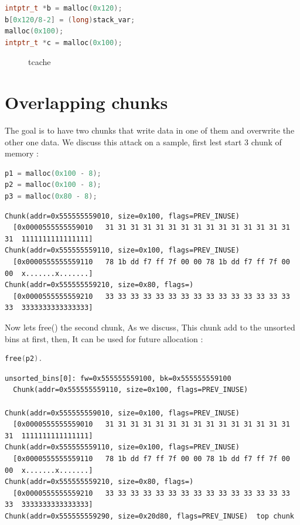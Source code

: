 \documentclass{masterthesis}
\newcommand*\tch{tcache}
\newcommand*\ub{unsorted bins}
\begin{document}
\begin{lstlisting}[language=c,frame=tlrb]
intptr_t *b = malloc(0x120);
b[0x120/8-2] = (long)stack_var;
malloc(0x100);
intptr_t *c = malloc(0x100);
\end{lstlisting}

 \begin{figure}[h!]
  \caption{\tch{}}
\end{figure}


\section{ Overlapping chunks}
The goal is to have two chunks that write data in one of them and overwrite the other one data. We discuss this attack on a sample, first lest start 3 chunk of memory :

\begin{lstlisting}[language=c,frame=tlrb]
p1 = malloc(0x100 - 8);
p2 = malloc(0x100 - 8);
p3 = malloc(0x80 - 8);
\end{lstlisting}

\begin{lstlisting}[frame=tlrb]
Chunk(addr=0x555555559010, size=0x100, flags=PREV_INUSE)
  [0x0000555555559010   31 31 31 31 31 31 31 31 31 31 31 31 31 31 31 31  1111111111111111]
Chunk(addr=0x555555559110, size=0x100, flags=PREV_INUSE)
  [0x0000555555559110   78 1b dd f7 ff 7f 00 00 78 1b dd f7 ff 7f 00 00  x.......x.......]
Chunk(addr=0x555555559210, size=0x80, flags=)
  [0x0000555555559210   33 33 33 33 33 33 33 33 33 33 33 33 33 33 33 33  3333333333333333]
\end{lstlisting}

Now lets free() the second chunk, As we discuss, This chunk add to the \ub{} at first, then, It can be used for future allocation :

\begin{lstlisting}[language=c,frame=tlrb]
free(p2).
\end{lstlisting}

\begin{lstlisting}[frame=tlrb]
unsorted_bins[0]: fw=0x555555559100, bk=0x555555559100
  Chunk(addr=0x555555559110, size=0x100, flags=PREV_INUSE)

Chunk(addr=0x555555559010, size=0x100, flags=PREV_INUSE)
  [0x0000555555559010   31 31 31 31 31 31 31 31 31 31 31 31 31 31 31 31  1111111111111111]
Chunk(addr=0x555555559110, size=0x100, flags=PREV_INUSE)
  [0x0000555555559110   78 1b dd f7 ff 7f 00 00 78 1b dd f7 ff 7f 00 00  x.......x.......]
Chunk(addr=0x555555559210, size=0x80, flags=)
  [0x0000555555559210   33 33 33 33 33 33 33 33 33 33 33 33 33 33 33 33  3333333333333333]
Chunk(addr=0x555555559290, size=0x20d80, flags=PREV_INUSE)  top chunk
\end{lstlisting}
\end{document}
